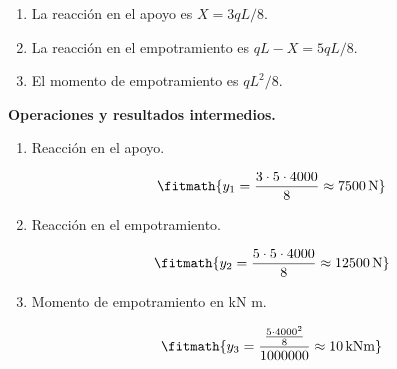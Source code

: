 \begin{enumerate}

\item La reacción en el apoyo es $X = 3qL/8$.

\item La reacción en el empotramiento es $qL - X = 5qL/8$.

\item El momento de empotramiento es $qL^2/8$.

\end{enumerate}

\noindent\textbf{Operaciones y resultados intermedios.}

\begin{enumerate}

\item Reacción en el apoyo.

\[\fitmath{y_{1}=\frac{3\cdot 5\cdot 4000}{8}\approx 7500\,\mathrm{N}}\]

\item Reacción en el empotramiento.

\[\fitmath{y_{2}=\frac{5\cdot 5\cdot 4000}{8}\approx 12500\,\mathrm{N}}\]

\item Momento de empotramiento en kN m.

\[\fitmath{y_{3}=\frac{\frac{5\cdot {4000}^{2}}{8}}{1000000}\approx 10\,\mathrm{kN m}}\]

\end{enumerate}
